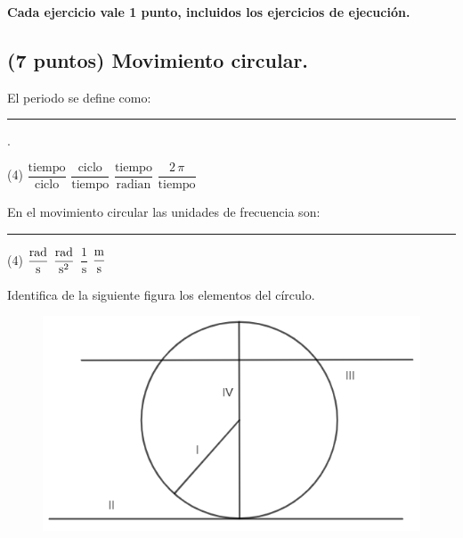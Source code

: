 \documentclass[12pt, letter]{exam}
\begin{document}
% 


\begin{center}
\textbf{Cada ejercicio vale 1 punto, incluidos los ejercicios de ejecución.}
\end{center}

\begin{questions}

    \section{(7 puntos) Movimiento circular.}

    \question El periodo se define como: \rule{2cm}{0.1mm}.
    \begin{tasks}(4)
        \task $\dfrac{\text{tiempo}}{\text{ciclo}}$
        \task $\dfrac{\text{ciclo}}{\text{tiempo}}$
        \task $\dfrac{\text{tiempo}}{\text{radian}}$
        \task $\dfrac{2 \, \pi}{\text{tiempo}}$
    \end{tasks}
    \question En el movimiento circular las unidades de frecuencia son: \rule{2cm}{0.1mm}
    \begin{tasks}(4)
        \task $\displaystyle \unit[per-mode=fraction]{\radian\per\second}$
        \task $\displaystyle \unit[per-mode=fraction]{\radian\per\square\second}$
        \task $\dfrac{1}{\unit{\second}}$
        \task $\displaystyle \unit[per-mode=fraction]{\meter\per\second}$
    \end{tasks}
    \question Identifica de la siguiente figura los elementos del círculo.
    \begin{figure}[H]
        \centering
        \includegraphics[scale=0.9]{Elementos_Circulo_02.png}
    \end{figure}
    \begin{multicols}{2}
    \begin{parts}

\end{parts}
\end{multicols}
\end{questions}
\end{document}
